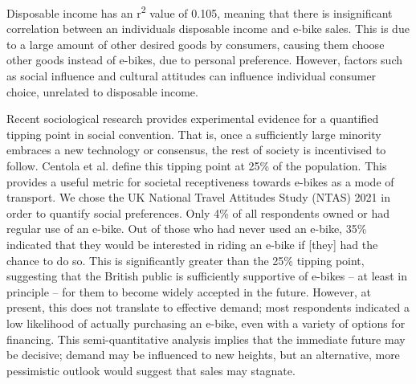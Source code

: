 Disposable income has an r\textsuperscript{2} value of 0.105, meaning that there is insignificant correlation between an individual\textquotesingle s disposable income and e-bike sales. This is due to a large amount of other desired goods by consumers, causing them choose other goods instead of e-bikes, due to personal preference. However, factors such as social influence and cultural attitudes can influence individual consumer choice, unrelated to disposable income.

Recent sociological research provides experimental evidence for a quantified tipping point in social convention. That is, once a sufficiently large minority embraces a new technology or consensus, the rest of society is incentivised to follow. Centola et al. define this tipping point at 25\% of the population. This provides a useful metric for societal receptiveness towards e-bikes as a mode of transport. We chose the UK National Travel Attitudes Study (NTAS) 2021 in order to quantify social preferences. Only 4\% of all respondents owned or had regular use of an e-bike. Out of those who had never used an e-bike, 35\% indicated that they would be interested in riding an e-bike if [they] had the chance to do so.  This is significantly greater than the 25\% tipping point, suggesting that the British public is sufficiently supportive of e-bikes – at least in principle – for them to become widely accepted in the future. However, at present, this does not translate to effective demand; most respondents indicated a low likelihood of actually purchasing an e-bike, even with a variety of options for financing. This semi-quantitative analysis implies that the immediate future may be decisive; demand may be influenced to new heights, but an alternative, more pessimistic outlook would suggest that sales may stagnate.
